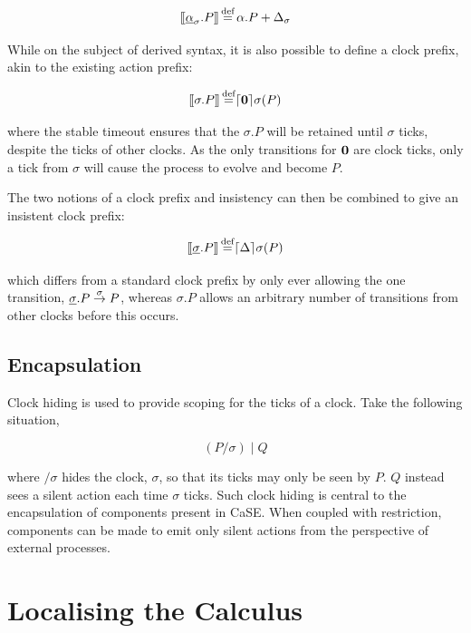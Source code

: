 \begin{equation}
[\hspace{-0.3ex}[ \underline{\alpha}_{\sigma}.P ]\hspace{-0.3ex}] \operatorname{\stackrel{\textrm{def}}{=}} \alpha.P + \Delta_{\sigma} 
\end{equation}

While on the subject of derived syntax, it is also possible to define
a clock prefix, akin to the existing action prefix:

\begin{equation}
[\hspace{-0.3ex}[ \sigma.P ]\hspace{-0.3ex}] \operatorname{\stackrel{\textrm{def}}{=}} \lceil{\textbf{0}}\rceil {\sigma} ({P})
\end{equation}

\noindent where the stable timeout ensures that the $\sigma.P$ will be
retained until $\sigma$ ticks, despite the ticks of other clocks.  As
the only transitions for $\textbf{0}$ are clock ticks, only a tick from
$\sigma$ will cause the process to evolve and become $P$.

The two notions of a clock prefix and insistency can then be combined
to give an insistent clock prefix:

\begin{equation}
[\hspace{-0.3ex}[ \underline{\sigma}.P ]\hspace{-0.3ex}] \operatorname{\stackrel{\textrm{def}}{=}} \lceil{\Delta}\rceil {\sigma} ({P})
\end{equation}

\noindent which differs from a standard clock prefix by only ever
allowing the one transition, $\underline{\sigma}.P \stackrel{\sigma}{\rightarrow}
P$, whereas $\sigma.P$ allows an arbitrary number of transitions from
other clocks before this occurs.

\subsection{Encapsulation}

Clock hiding is used to provide scoping for the ticks of a
clock.  Take the following situation,

\begin{equation}
\label{clockhidingex}
  (P / \sigma)\;|\;Q
\end{equation}

\noindent where $/ \sigma$ hides the clock, $\sigma$, so that its
ticks may only be seen by $P$.  $Q$ instead sees a silent action each
time $\sigma$ ticks.  Such clock hiding is central to the
encapsulation of components present in CaSE.  When coupled with
restriction, components can be made to emit only silent actions from
the perspective of external processes.

\section{Localising the Calculus}

